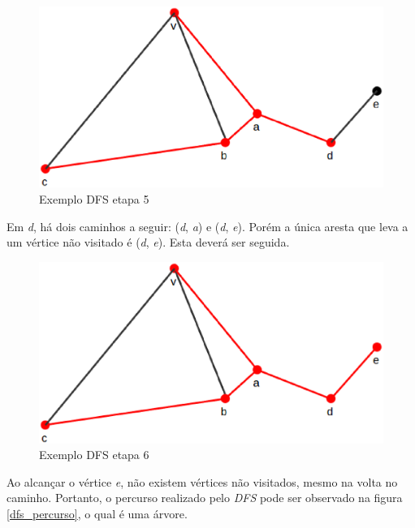 \begin{apendicesenv}
\begin{figure}[!h]
	\centering
	\includegraphics[scale=0.25]{figuras/referencial_teorico/dfs/dfs5.eps}
	\caption[Exemplo DFS etapa 5]{Exemplo DFS etapa 5 \cite{Cormen:2001}}
	\label{dfs5}
\end{figure}

Em \textit{d}, há dois caminhos a seguir: (\textit{d}, \textit{a}) e (\textit{d}, \textit{e}). Porém a única aresta que leva a um vértice não visitado é (\textit{d}, \textit{e}). Esta deverá ser seguida.

\begin{figure}[!h]
	\centering
	\includegraphics[scale=0.25]{figuras/referencial_teorico/dfs/dfs6.eps}
	\caption[Exemplo DFS etapa 6]{Exemplo DFS etapa 6 \cite{Cormen:2001}}
	\label{dfs6}
\end{figure}

Ao alcançar o vértice \textit{e}, não existem vértices não visitados, mesmo na volta no caminho. Portanto, o percurso realizado pelo \textit{DFS} pode ser observado na figura \ref{dfs_percurso}, o qual é uma árvore.


\end{apendicesenv}
